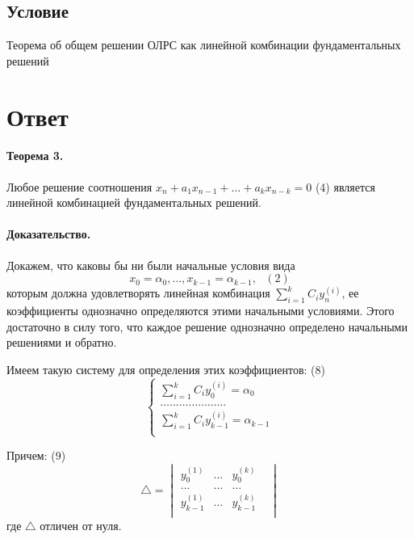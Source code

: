 \documentclass{report}
\begin{document}
\subsection{Условие}
Теорема об общем решении ОЛРС как линейной комбинации фундаментальных
решений

\section{Ответ}
\paragraph*{Теорема 3.}
Любое решение соотношения $x_{n}+a_1x_{n-1}+\ldots+a_{k}x_{n-k} = 0$ (4)
является линейной комбинацией фундаментальных решений.

\paragraph*{Доказательство.}
Докажем, что каковы бы ни были начальные условия вида
\[
	x_0=\alpha_0, \ldots, x_{k-1}=\alpha_{k-1}, \mbox{   }(2)
\] 
которым должна удовлетворять
линейная комбинация $\sum_{i=1}^{k}C_{i}y^{(i)}_{n} $, ее коэффициенты
однозначно определяются этими начальными условиями. Этого достаточно в силу
того, что каждое решение однозначно определено начальными решениями и обратно.

Имеем такую систему для определения этих коэффициентов: (8)
\[
\begin{cases}
	\sum\limits_{i=1}^{k}C_{i}y^{(i)}_{0} = \alpha_0\\ 
	\ldots\ldots\ldots\ldots\ldots\ldots\ldots\\
	\sum\limits_{i=1}^{k}C_{i}y^{(i)}_{k-1} = \alpha_{k-1}\\ 
\end{cases}
\] 

Причем: (9)
\[
	\triangle = \begin{vmatrix}
		y_{0}^{(1)}& \ldots& y_{0}^{(k)}&\\
		\ldots& \ldots& \ldots& \\
		y_{k-1}^{(1)}& \ldots& y_{k-1}^{(k)}&\\
	\end{vmatrix}
\] 
где $\triangle$ отличен от нуля.
\end{document}
